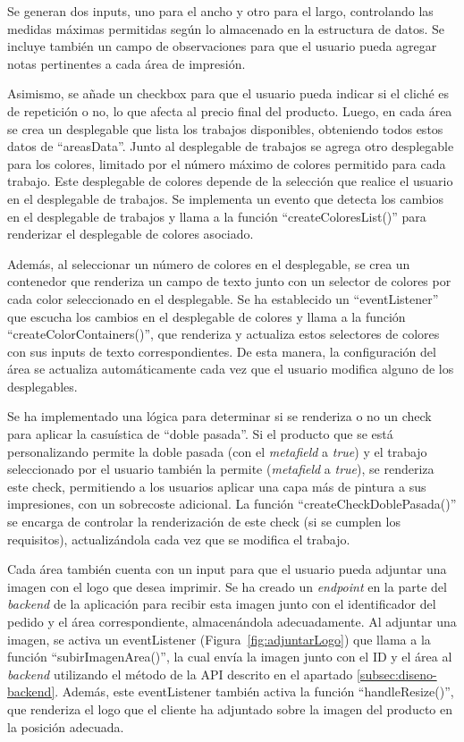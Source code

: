 \documentclass[11pt]{article}
\begin{document}
Se generan dos inputs, uno para el ancho y otro para el largo, controlando las medidas máximas permitidas según lo almacenado en la estructura de datos.
Se incluye también un campo de observaciones para que el usuario pueda agregar notas pertinentes a cada área de impresión.

Asimismo, se añade un checkbox para que el usuario pueda indicar si el cliché es de repetición o no, lo que afecta al precio final del producto. Luego, 
en cada área se crea un desplegable que lista los trabajos disponibles, obteniendo todos estos datos de ``areasData''. Junto al desplegable de trabajos se agrega 
otro desplegable para los colores, limitado por el número máximo de colores permitido para cada trabajo. Este desplegable de colores depende de la selección que realice el usuario en el desplegable de trabajos. Se implementa un evento que detecta los cambios en el 
desplegable de trabajos y llama a la función ``createColoresList()'' para renderizar el desplegable de colores asociado.

Además, al seleccionar un número de colores en el desplegable, se crea un contenedor que renderiza un campo de texto junto con un selector de colores por cada 
color seleccionado en el desplegable. Se ha establecido un ``eventListener'' que escucha los cambios en el desplegable de colores y llama a la función 
``createColorContainers()'', que renderiza y actualiza estos selectores de colores con sus inputs de texto correspondientes. De esta manera, 
la configuración del área se actualiza automáticamente cada vez que el usuario modifica alguno de los desplegables.

Se ha implementado una lógica para determinar si se renderiza o no un check para aplicar la casuística de ``doble pasada''. Si el producto que se está 
personalizando permite la doble pasada (con el \textit{metafield} a \textit{true}) y el trabajo seleccionado por el usuario también la permite 
(\textit{metafield} a \textit{true}), se renderiza este check, permitiendo a los usuarios aplicar una capa más de pintura a sus impresiones, 
con un sobrecoste adicional. La función ``createCheckDoblePasada()'' se encarga de controlar la renderización de este check (si se cumplen los requisitos), 
actualizándola cada vez que se modifica el trabajo.

Cada área también cuenta con un input para que el usuario pueda adjuntar una imagen con el logo que desea imprimir. Se ha creado un \textit{endpoint} en 
la parte del \textit{backend} de la aplicación para recibir esta imagen junto con el identificador del pedido y el área correspondiente, 
almacenándola adecuadamente. Al adjuntar una imagen, se activa un eventListener (Figura~\ref{fig:adjuntarLogo}) que llama a la función ``subirImagenArea()'', 
la cual envía la imagen junto con el ID y el área al \textit{backend} utilizando el método de la API descrito en el apartado \ref{subsec:diseno-backend}. Además, este eventListener 
también activa la función ``handleResize()'', que renderiza el logo que el cliente ha adjuntado sobre la imagen del producto en la posición adecuada.
\end{document}
